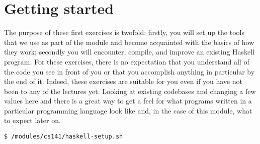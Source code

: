 \section{Getting started}

The purpose of these first exercises is twofold: firstly, you will set up the tools that we use as part of the module and become acquainted with the basics of how they work; secondly you will encounter, compile, and improve an existing Haskell program. For these exercises, there is no expectation that you understand all of the code you see in front of you or that you accomplish anything in particular by the end of it. Indeed, these exercises are suitable for you even if you have not been to any of the lectures yet. Looking at existing codebases and changing a few values here and there is a great way to get a feel for what programs written in a particular programming language look like and, in the case of this module, what to expect later on. 

\taskLine

\begin{verbatim}
$ /modules/cs141/haskell-setup.sh
\end{verbatim}

\taskLine

